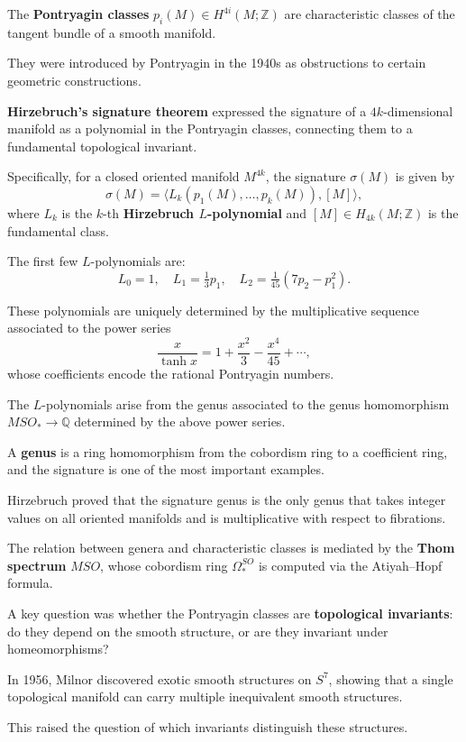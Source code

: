 The \textbf{Pontryagin classes} $p_i(M) \in H^{4i}(M; \mathbb{Z})$ are characteristic classes of the tangent bundle of a smooth manifold.

They were introduced by Pontryagin in the 1940s as obstructions to certain geometric constructions.

\textbf{Hirzebruch's signature theorem} expressed the signature of a $4k$-dimensional manifold as a polynomial in the Pontryagin classes, connecting them to a fundamental topological invariant.

Specifically, for a closed oriented manifold $M^{4k}$, the signature $\sigma(M)$ is given by
\[
\sigma(M) = \langle L_k(p_1(M), \ldots, p_k(M)), [M] \rangle,
\]
where $L_k$ is the $k$-th \textbf{Hirzebruch $L$-polynomial} and $[M] \in H_{4k}(M; \mathbb{Z})$ is the fundamental class.

The first few $L$-polynomials are:
\[
L_0 = 1, \quad L_1 = \tfrac{1}{3}p_1, \quad L_2 = \tfrac{1}{45}(7p_2 - p_1^2).
\]

These polynomials are uniquely determined by the multiplicative sequence associated to the power series
\[
\frac{x}{\tanh x} = 1 + \frac{x^2}{3} - \frac{x^4}{45} + \cdots,
\]
whose coefficients encode the rational Pontryagin numbers.

The $L$-polynomials arise from the genus associated to the genus homomorphism $MSO_* \to \mathbb{Q}$ determined by the above power series.

A \textbf{genus} is a ring homomorphism from the cobordism ring to a coefficient ring, and the signature is one of the most important examples.

Hirzebruch proved that the signature genus is the only genus that takes integer values on all oriented manifolds and is multiplicative with respect to fibrations.

The relation between genera and characteristic classes is mediated by the \textbf{Thom spectrum} $MSO$, whose cobordism ring $\Omega_*^{SO}$ is computed via the Atiyah--Hopf formula.

A key question was whether the Pontryagin classes are \textbf{topological invariants}: do they depend on the smooth structure, or are they invariant under homeomorphisms?

In 1956, Milnor discovered exotic smooth structures on $S^7$, showing that a single topological manifold can carry multiple inequivalent smooth structures.

This raised the question of which invariants distinguish these structures.

